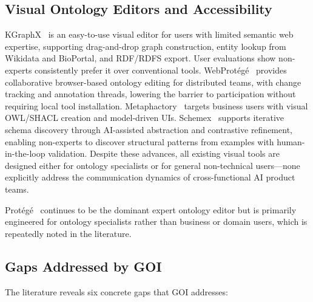 \documentclass[runningheads,a4paper]{llncs}
\begin{document}
\subsection{Visual Ontology Editors and Accessibility}

KGraphX~\cite{rodriguez2023kgraphx} is an easy-to-use visual editor
for users with limited semantic web expertise, supporting drag-and-drop
graph construction, entity lookup from Wikidata and BioPortal, and
RDF/RDFS export. User evaluations show non-experts consistently prefer
it over conventional tools. WebProt\'eg\'e~\cite{patel2023ontospread}
provides collaborative browser-based ontology editing for distributed
teams, with change tracking and annotation threads, lowering the barrier
to participation without requiring local tool installation.
Metaphactory~\cite{haase2022metaphactory} targets business users with
visual OWL/SHACL creation and model-driven UIs. Schemex~\cite{garcia2022semanco}
supports iterative schema discovery through AI-assisted abstraction and
contrastive refinement, enabling non-experts to discover structural
patterns from examples with human-in-the-loop validation.
Despite these advances, all existing visual tools are designed either
for ontology specialists or for general non-technical users---none
explicitly address the communication dynamics of cross-functional AI
product teams.

Protég\'e~\cite{musen2015protege} continues to be the dominant expert
ontology editor but is primarily engineered for ontology specialists
rather than business or domain users, which is repeatedly noted in the
literature.

\subsection{Gaps Addressed by GOI}

The literature reveals six concrete gaps that GOI addresses:
\end{document}

